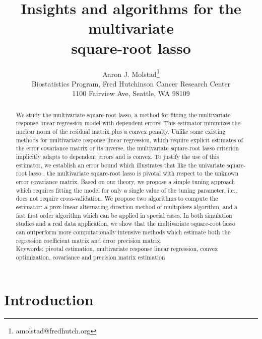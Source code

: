 \documentclass[12pt]{article}
\begin{document}
\title{Insights and algorithms for the multivariate\\ square-root lasso}

\author{
Aaron J. Molstad\thanks{amolstad@fredhutch.org}\\
 Biostatistics Program, Fred Hutchinson Cancer Research Center\\
 1100 Fairview Ave, Seattle, WA 98109
}
 \date{}
\maketitle
\begin{abstract}
{We study the multivariate square-root lasso, a method for fitting the multivariate response linear regression model with dependent errors. This estimator minimizes the nuclear norm of the residual matrix plus a convex penalty. Unlike some existing methods for multivariate response linear regression, which require explicit estimates of the error covariance matrix or its inverse, the multivariate square-root lasso criterion implicitly adapts to dependent errors and is convex. To justify the use of this estimator, we establish an error bound which illustrates that like the univariate square-root lasso \citep{belloni2011square}, the multivariate square-root lasso is pivotal with respect to the unknown error covariance matrix. Based on our theory, we propose a simple tuning approach which requires fitting the model for only a single value of the tuning parameter, i.e., does not require cross-validation. We propose two algorithms to compute the estimator: a prox-linear alternating direction method of multipliers algorithm, and a fast first order algorithm which can be applied in special cases. In both simulation studies and a real data application, we show that the multivariate square-root lasso can outperform more computationally intensive methods which estimate both the regression coefficient matrix and error precision matrix.\\

\noindent Keywords: pivotal estimation, multivariate response linear regression, convex optimization, covariance and precision matrix estimation}
\end{abstract}

\section{Introduction}
\end{document}
